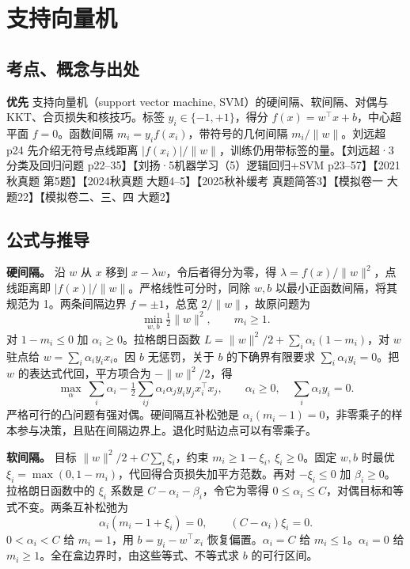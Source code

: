 \documentclass[UTF8,a4paper,zihao=-4,fontset=fandol]{ctexart}
\begin{document}
\section{支持向量机}
\label{ch:prml-svm}

\subsection{考点、概念与出处}
\textbf{优先} 支持向量机（support vector machine, SVM）的硬间隔、软间隔、对偶与 KKT、合页损失和核技巧。标签 \(y_i\in\{-1,+1\}\)，得分 \(f(x)=w^\top x+b\)，中心超平面 \(f=0\)。函数间隔 \(m_i=y_if(x_i)\)，带符号的几何间隔 \(m_i/\|w\|\)。刘远超 p24 先介绍无符号点线距离 \(|f(x_i)|/\|w\|\)，训练仍用带标签的量。【刘远超·3 分类及回归问题 p22–35】【刘扬·5机器学习（5）逻辑回归+SVM p23–57】【2021秋真题 第5题】【2024秋真题 大题4–5】【2025秋补缓考 真题简答3】【模拟卷一 大题22】【模拟卷二、三、四 大题2】

\subsection{公式与推导}
\textbf{硬间隔。} 沿 \(w\) 从 \(x\) 移到 \(x-\lambda w\)，令后者得分为零，得 \(\lambda=f(x)/\|w\|^2\)，点线距离即 \(|f(x)|/\|w\|\)。严格线性可分时，同除 \(w,b\) 以最小正函数间隔，将其规范为 1。两条间隔边界 \(f=\pm1\)，总宽 \(2/\|w\|\)，故原问题为
\[
 \min_{w,b}\tfrac12\|w\|^2,\qquad m_i\ge1.
\]
对 \(1-m_i\le0\) 加 \(\alpha_i\ge0\)。拉格朗日函数 \(L=\|w\|^2/2+\sum_i\alpha_i(1-m_i)\)，对 \(w\) 驻点给 \(w=\sum_i\alpha_i y_i x_i\)。因 \(b\) 无惩罚，关于 \(b\) 的下确界有限要求 \(\sum_i\alpha_i y_i=0\)。把 \(w\) 的表达式代回，平方项合为 \(-\|w\|^2/2\)，得
\[
 \max_\alpha\ \sum_i\alpha_i-\tfrac12\sum_{ij}
   \alpha_i\alpha_jy_iy_jx_i^\top x_j,\qquad
 \alpha_i\ge0,\quad \sum_i\alpha_i y_i=0.
\]
严格可行的凸问题有强对偶。硬间隔互补松弛是 \(\alpha_i(m_i-1)=0\)，非零乘子的样本参与决策，且贴在间隔边界上。退化时贴边点可以有零乘子。

\textbf{软间隔。} 目标 \(\|w\|^2/2+C\sum_i\xi_i\)，约束 \(m_i\ge1-\xi_i,\ \xi_i\ge0\)。固定 \(w,b\) 时最优 \(\xi_i=\max(0,1-m_i)\)，代回得合页损失加平方范数。再对 \(-\xi_i\le0\) 加 \(\beta_i\ge0\)。拉格朗日函数中的 \(\xi_i\) 系数是 \(C-\alpha_i-\beta_i\)，令它为零得 \(0\le\alpha_i\le C\)，对偶目标和等式不变。两条互补松弛为
\[
 \alpha_i(m_i-1+\xi_i)=0,\qquad (C-\alpha_i)\xi_i=0.
\]
\(0<\alpha_i<C\) 给 \(m_i=1\)，用 \(b=y_i-w^\top x_i\) 恢复偏置。\(\alpha_i=C\) 给 \(m_i\le1\)。\(\alpha_i=0\) 给 \(m_i\ge1\)。全在盒边界时，由这些等式、不等式求 \(b\) 的可行区间。
\end{document}
